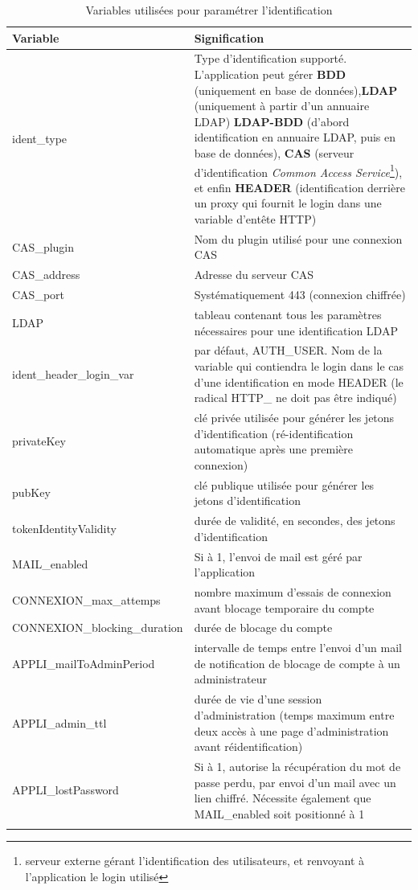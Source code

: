 \begin{longtable}{|p{6cm}|p{10cm}|}
\hline
\textbf{Variable} & \textbf{Signification} \\
\hline
\endhead
ident\_type & Type d'identification supporté. L'application peut gérer \textbf{BDD} (uniquement en base de données),\textbf{LDAP} (uniquement à partir d'un annuaire LDAP) \textbf{LDAP-BDD} (d'abord identification en annuaire LDAP, puis en base de données), \textbf{CAS} (serveur d'identification \textit{Common Access Service}\footnote{serveur externe gérant l'identification des utilisateurs, et renvoyant à l'application le login utilisé}), et enfin \textbf{HEADER} (identification derrière un proxy qui fournit le login dans une variable d'entête HTTP)\\
\hline
CAS\_plugin & Nom du plugin utilisé pour une connexion CAS \\
\hline
CAS\_address & Adresse du serveur CAS\\
\hline
CAS\_port & Systématiquement 443 (connexion chiffrée)\\
\hline
LDAP & tableau contenant tous les paramètres nécessaires pour une identification LDAP \\
\hline
ident\_header\_login\_var & par défaut, AUTH\_USER. Nom de la variable qui contiendra le login dans le cas d'une identification en mode HEADER (le radical HTTP\_  ne doit pas être indiqué) \\
\hline
privateKey & clé privée utilisée pour générer les jetons d'identification (ré-identification automatique après une première connexion) \\
\hline
pubKey & clé publique utilisée pour générer les jetons d'identification \\
\hline
tokenIdentityValidity & durée de validité, en secondes, des jetons d'identification\\
\hline
MAIL\_enabled & Si à 1, l'envoi de mail est géré par l'application \\
\hline
CONNEXION\_max\_attemps & nombre maximum d'essais de connexion avant blocage temporaire du compte \\
\hline
CONNEXION\_blocking\_duration & durée de blocage du compte \\
\hline
APPLI\_mailToAdminPeriod & intervalle de temps entre l'envoi d'un mail de notification de blocage de compte à un administrateur \\
\hline
APPLI\_admin\_ttl & durée de vie d'une session d'administration (temps maximum entre deux accès à une page d'administration avant réidentification) \\
\hline
APPLI\_lostPassword & Si à 1, autorise la récupération du mot de passe perdu, par envoi d'un mail avec un lien chiffré. Nécessite également que MAIL\_enabled soit positionné à 1 \\
\hline

\caption{Variables utilisées pour paramétrer l'identification}
\end{longtable}


